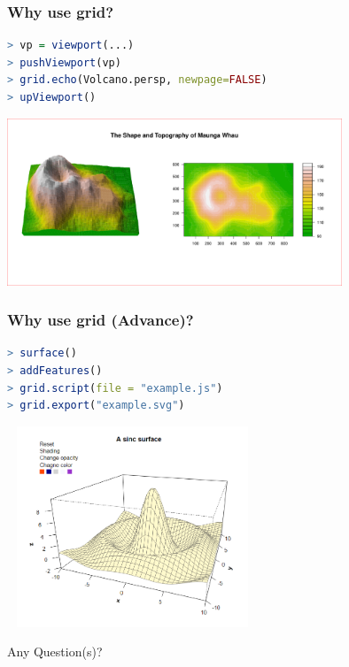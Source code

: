 \documentclass{beamer}
\begin{document}
\begin{frame}[fragile]
\frametitle{Why use \textbf{grid}?}

\begin{lstlisting}[language = R]
> vp = viewport(...)
> pushViewport(vp)
> grid.echo(Volcano.persp, newpage=FALSE)
> upViewport()
\end{lstlisting}

\begin{center}
  \includegraphics[height = 5cm, width = 10cm]{plot/demo_grid_example_3.pdf}
\end{center}

\end{frame}


\begin{frame}[fragile]
\frametitle{Why use \textbf{grid} (Advance)?}

\begin{lstlisting}[language = R]
> surface()
> addFeatures()
> grid.script(file = "example.js")
> grid.export("example.svg")

\end{lstlisting}

\begin{center}
  \includegraphics[height = 6cm, width = 7.5cm]{plot/origin_1.PNG}
\end{center}

\end{frame}


\begin{frame}[fragile]

\begin{center}
\Huge Any Question(s)?
\end{center}


\end{frame}
\end{document}

